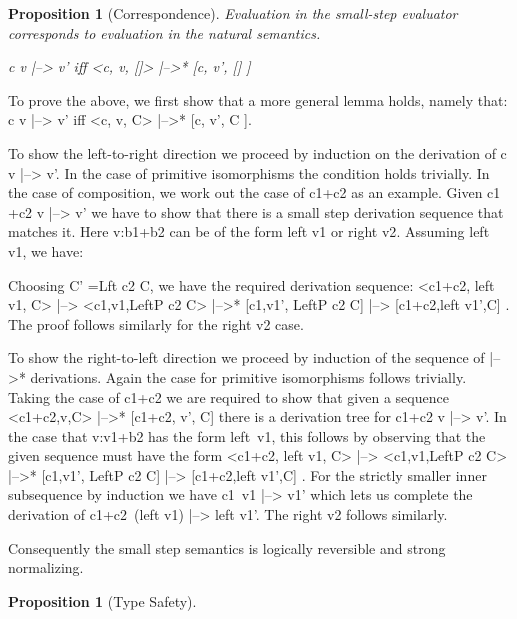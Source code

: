 \documentclass[preprint]{sigplanconf}
\newtheorem{proposition}[theorem]{Proposition}
\newenvironment{proof}[1][Proof.]{\begin{trivlist}\item[\hskip \labelsep {\bfseries #1}]}{\end{trivlist}}
\begin{document}
\begin{proposition}[Correspondence]
  Evaluation in the small-step evaluator corresponds to evaluation in
  the natural semantics.

  {{c v |--> v'}} iff {{<c, v, []> |-->* [c, v', [] ]}}
\end{proposition}
\begin{proof}
  To prove the above, we first show that a more general lemma holds,
  namely that: {{c v |--> v'}} iff {{<c, v, C> |-->* [c, v', C ]}}.

  To show the left-to-right direction we proceed by induction on the
  derivation of {{c v |--> v'}}. In the case of primitive isomorphisms
  the condition holds trivially. In the case of composition, we work
  out the case of {{c1+c2}} as an example. Given {{c1 +c2 v |--> v'}}
  we have to show that there is a small step derivation sequence that
  matches it. Here {{v:b1+b2}} can be of the form {{left v1}} or
  {{right v2}}. Assuming {{left v1}}, we have: 


Choosing {{C' =Lft c2 C}}, we have the required derivation sequence: 
{{ <c1+c2, left v1, C> |--> <c1,v1,LeftP c2 C> |-->* {[c1,v1', LeftP c2 C]} |--> {[c1+c2,left v1',C]} }}. The proof follows similarly for the {{right v2}} case.  

To show the right-to-left direction we proceed by induction of the
sequence of {{|-->*}} derivations. Again the case for primitive
isomorphisms follows trivially. Taking the case of {{c1+c2}} we are
required to show that given a sequence 
{{<c1+c2,v,C> |-->* {[c1+c2, v', C]} }} there is a derivation tree for
{{c1+c2 v |--> v'}}. In the case that {{v:v1+b2}} has the form
{{left~v1}}, this follows by observing that the given sequence must have the form
{{ <c1+c2, left v1, C> |--> <c1,v1,LeftP c2 C> |-->* {[c1,v1', LeftP c2 C]} |--> {[c1+c2,left v1',C]} }}. 
For the strictly smaller inner subsequence by induction we have
{{c1~v1 |--> v1'}} which lets us complete the derivation of
{{c1+c2~(left v1) |--> left v1'}}. The {{right v2}} follows similarly. 

\end{proof}

Consequently the small step semantics is logically reversible and
strong normalizing. 

\begin{proposition}[Type Safety]
  
\end{proposition}
\end{document}
